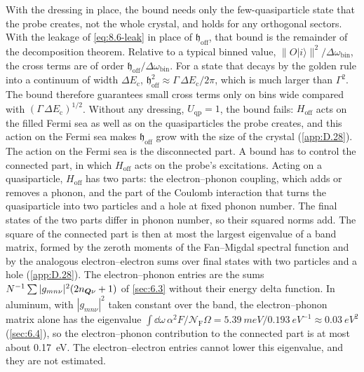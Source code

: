 With the dressing in place, the bound needs only the few-quasiparticle state that the probe creates, not the whole crystal, and holds for any orthogonal sectors. With the leakage of \cref{eq:8.6-leak} in place of $\mathfrak{h}_{\mathrm{off}}$, that bound is the remainder of the decomposition theorem. Relative to a typical binned value, $\|O|i\rangle\|^2/\Delta\omega_{\mathrm{bin}}$, the cross terms are of order $\mathfrak{h}_{\mathrm{off}}/\Delta\omega_{\mathrm{bin}}$. For a state that decays by the golden rule into a continuum of width $\Delta E_{\mathrm{c}}$, $\mathfrak{h}_{\mathrm{off}}^2 \approx \varGamma\,\Delta E_{\mathrm{c}}/2\pi$, which is much larger than $\varGamma^2$. The bound therefore guarantees small cross terms only on bins wide compared with $(\varGamma\,\Delta E_{\mathrm{c}})^{1/2}$. Without any dressing, $U_{\mathrm{qp}} = 1$, the bound fails: $H_{\mathrm{off}}$ acts on the filled Fermi sea as well as on the quasiparticles the probe creates, and this action on the Fermi sea makes $\mathfrak{h}_{\mathrm{off}}$ grow with the size of the crystal (\cref{app:D.28}). The action on the Fermi sea is the disconnected part. A bound has to control the connected part, in which $H_{\mathrm{off}}$ acts on the probe's excitations. Acting on a quasiparticle, $H_{\mathrm{off}}$ has two parts: the electron--phonon coupling, which adds or removes a phonon, and the part of the Coulomb interaction that turns the quasiparticle into two particles and a hole at fixed phonon number. The final states of the two parts differ in phonon number, so their squared norms add. The square of the connected part is then at most the largest eigenvalue of a band matrix, formed by the zeroth moments of the Fan--Migdal spectral function and by the analogous electron--electron sums over final states with two particles and a hole (\cref{app:D.28}). The electron--phonon entries are the sums $N^{-1}\sum|g_{mn\nu}|^2(2n_{\bm{Q}\nu} + 1)$ of \cref{sec:6.3} without their energy delta function. In aluminum, with $|g_{mn\nu}|^2$ taken constant over the band, the electron--phonon matrix alone has the eigenvalue $\int\dd\omega\,\alpha^2F/\mathcal{N}_{\mathrm{F}}\Omega = \SI{5.39}{meV}/\SI{0.193}{eV^{-1}} \approx \SI{0.03}{eV^2}$ (\cref{sec:6.4}), so the electron--phonon contribution to the connected part is at most about \SI{0.17}{eV}. The electron--electron entries cannot lower this eigenvalue, and they are not estimated.

